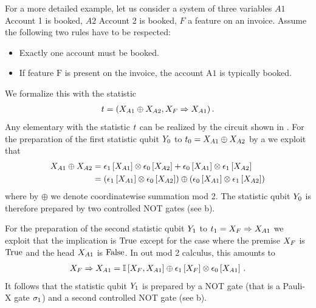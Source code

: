 \begin{example}
    \label{exa:toyAccounting}
    For a more detailed example, let us consider a system of three variables $A1$ Account 1 is booked, $A2$ Account 2 is booked, $F$ a feature on an invoice.
    Assume the following two rules have to be respected:
    \begin{itemize}
        \item \textcolor{\concolor}{Exactly one account must be booked.}
        \item \textcolor{\probcolor}{If feature $\mathrm{F}$ is present on the invoice, the account $\mathrm{A1}$ is typically booked.}
    \end{itemize}
    We formalize this with the statistic
    \begin{align*}
        t = (X_{A1} \oplus X_{A2}, X_{F}\Rightarrow X_{A1})\, .
    \end{align*}
    Any elementary \ComputationActivationNetwork{} with the statistic $t$ can be realized by the circuit shown in .
    For the preparation of the first statistic qubit $Y_{0}$ to $t_{0}=X_{A1} \oplus X_{A2}$ by a \computationCircuit{} we exploit that
    \begin{align*}
        X_{A1}\oplus X_{A2}
        &= \epsilon_{1}\left[X_{A1}\right] \otimes \epsilon_{0}\left[X_{A2}\right]
        + \epsilon_{0}\left[X_{A1}\right] \otimes \epsilon_{1}\left[X_{A2}\right] \\
        &= \left(\epsilon_{1}\left[X_{A1}\right] \otimes \epsilon_{0}\left[X_{A2}\right]\right)
        \oplus \left(\epsilon_{0}\left[X_{A1}\right] \otimes \epsilon_{1}\left[X_{A2}\right]\right)
    \end{align*}
    where by $\oplus$ we denote coordinatewise summation mod 2.
    The statistic qubit $Y_{0}$ is therefore prepared by two controlled NOT gates (see b).

    For the preparation of the second statistic qubit $Y_{1}$ to $t_{1}=X_{F}\Rightarrow X_{A1}$ we exploit that the implication is $\mathrm{True}$ except for the case where the premise $X_{F}$ is $\mathrm{True}$ and the head $X_{A1}$ is $\mathrm{False}$.
    In out mod 2 calculus, this amounts to
    \begin{align*}
        X_{F}\Rightarrow X_{A1}
        = \mathbb{I}\left[X_{F},X_{A1}\right] \oplus \epsilon_{1}\left[X_{F}\right] \otimes \epsilon_{0}\left[X_{A1}\right]\, .
    \end{align*}
    It follows that the statistic qubit $Y_{1}$ is prepared by a NOT gate (that is a Pauli-X gate $\sigma_1$) and a second controlled NOT gate (see b).


\end{example}
